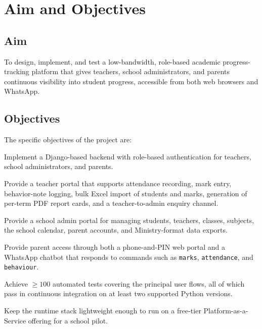 \documentclass[11pt,a4paper]{article}
\begin{document}
\section{Aim and Objectives}

\subsection{Aim}

To design, implement, and test a low-bandwidth, role-based academic
progress-tracking platform that gives teachers, school administrators, and
parents continuous visibility into student progress, accessible from both web
browsers and WhatsApp.

\subsection{Objectives}

The specific objectives of the project are:

\begin{description}[leftmargin=2.5em,style=nextline]
    \item[O1.] Implement a Django-based backend with role-based authentication
    for teachers, school administrators, and parents.

    \item[O2.] Provide a teacher portal that supports attendance recording,
    mark entry, behavior-note logging, bulk Excel import of students and
    marks, generation of per-term PDF report cards, and a teacher-to-admin
    enquiry channel.

    \item[O3.] Provide a school admin portal for managing students, teachers,
    classes, subjects, the school calendar, parent accounts, and
    Ministry-format data exports.

    \item[O4.] Provide parent access through both a phone-and-PIN web portal
    and a WhatsApp chatbot that responds to commands such as
    \texttt{marks}, \texttt{attendance}, and \texttt{behaviour}.

    \item[O5.] Achieve $\geq 100$ automated tests covering the principal user
    flows, all of which pass in continuous integration on at least two
    supported Python versions.

    \item[O6.] Keep the runtime stack lightweight enough to run on a
    free-tier Platform-as-a-Service offering for a school pilot.
\end{description}
\end{document}
